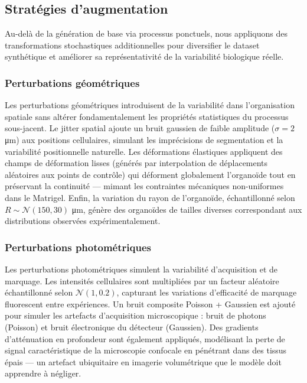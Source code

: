 \subsection{Stratégies d'augmentation}

Au-delà de la génération de base via processus ponctuels, nous appliquons des transformations stochastiques additionnelles pour diversifier le dataset synthétique et améliorer sa représentativité de la variabilité biologique réelle.

\subsubsection{Perturbations géométriques}

Les perturbations géométriques introduisent de la variabilité dans l'organisation spatiale sans altérer fondamentalement les propriétés statistiques du processus sous-jacent. Le jitter spatial ajoute un bruit gaussien de faible amplitude ($\sigma = 2$ μm) aux positions cellulaires, simulant les imprécisions de segmentation et la variabilité positionnelle naturelle. Les déformations élastiques appliquent des champs de déformation lisses (générés par interpolation de déplacements aléatoires aux points de contrôle) qui déforment globalement l'organoïde tout en préservant la continuité — mimant les contraintes mécaniques non-uniformes dans le Matrigel. Enfin, la variation du rayon de l'organoïde, échantillonné selon $R \sim \mathcal{N}(150, 30)$ μm, génère des organoïdes de tailles diverses correspondant aux distributions observées expérimentalement.

\subsubsection{Perturbations photométriques}

Les perturbations photométriques simulent la variabilité d'acquisition et de marquage. Les intensités cellulaires sont multipliées par un facteur aléatoire échantillonné selon $\mathcal{N}(1, 0.2)$, capturant les variations d'efficacité de marquage fluorescent entre expériences. Un bruit composite Poisson + Gaussien est ajouté pour simuler les artefacts d'acquisition microscopique : bruit de photons (Poisson) et bruit électronique du détecteur (Gaussien). Des gradients d'atténuation en profondeur sont également appliqués, modélisant la perte de signal caractéristique de la microscopie confocale en pénétrant dans des tissus épais — un artefact ubiquitaire en imagerie volumétrique que le modèle doit apprendre à négliger.

